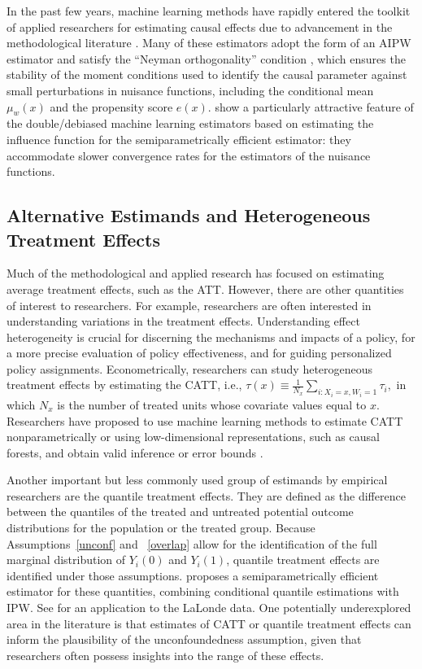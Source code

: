 \documentclass[letterpaper,12pt,leqno]{article}
\begin{document}
In the past few years, machine learning methods have rapidly entered the toolkit of applied researchers for estimating causal effects due to advancement in the methodological literature \citep{van2011targeted, chernozhukov2017double, athey2018approximate, athey2019generalized}. Many of these estimators adopt the form of an AIPW estimator and satisfy the ``Neyman orthogonality'' condition \citep{neyman1979c}, which ensures the stability of the moment conditions used to identify the causal parameter against small perturbations in nuisance functions, including the conditional mean $\mu_{w}(x)$ and the propensity score $e(x)$.  \cite{chernozhukov2017double, chernozhukov2018double} show a particularly attractive feature of the double/debiased machine learning estimators based on estimating the influence function for the semiparametrically efficient estimator: they accommodate slower convergence rates for the estimators of the nuisance functions.

\subsection{Alternative Estimands and Heterogeneous Treatment Effects}

Much of the methodological and applied research has focused on estimating average treatment effects, such as the ATT. However, there are other quantities of interest to researchers. For example, researchers are often interested in understanding variations in the treatment effects. Understanding effect heterogeneity is crucial for discerning the mechanisms and impacts of a policy, for a more precise evaluation of policy effectiveness, and for guiding personalized policy assignments. Econometrically, researchers can study heterogeneous treatment effects by estimating the CATT, i.e., $\tau(x)\equiv \frac{1}{N_{x}}\sum_{i: X_i= x, W_i = 1} \tau_{i},$ in which $N_{x}$ is the number of treated units whose covariate values equal to $x$. Researchers have proposed to use machine learning methods to estimate CATT nonparametrically or using low-dimensional representations, such as causal forests, and obtain valid inference or error bounds \citep[{\it e.g.},][]{athey2016recursive, wagerathey, athey2019generalized}. 

Another important but less commonly used group of estimands by empirical researchers are the quantile treatment effects. They are defined as the difference between the quantiles of the treated and untreated potential outcome distributions for the population or the treated group. Because Assumptions~\ref{unconf} and ~\ref{overlap} allow for the identification of the full marginal distribution of $Y_{i}(0)$ and $Y_{i}(1)$, quantile treatment effects are identified under those assumptions. \citet{firpo2007efficient} proposes a semiparametrically efficient estimator for these quantities, combining conditional quantile estimations with IPW. See \citet{bitler2006mean} for an application to the LaLonde data. One potentially underexplored area in the literature is that estimates of CATT or quantile treatment effects can inform the plausibility of the unconfoundedness assumption, given that researchers often possess insights into the range of these effects.
\end{document}
